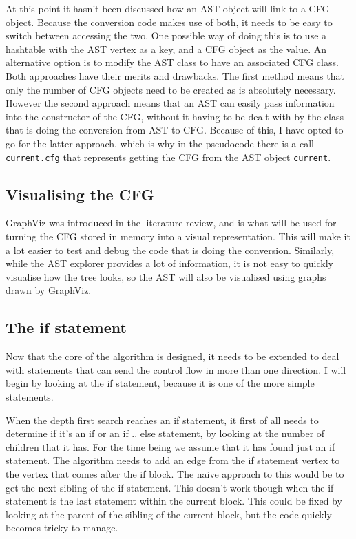 At this point it hasn't been discussed how an AST object will link to a CFG object. Because the conversion code makes use of both, it needs to be easy to switch between accessing the two. One possible way of doing this is to use a hashtable with the AST vertex as a key, and a CFG object as the value. An alternative option is to modify the AST class to have an associated CFG class. Both approaches have their merits and drawbacks. The first method means that only the number of CFG objects need to be created as is absolutely necessary. However the second approach means that an AST can easily pass information into the constructor of the CFG, without it having to be dealt with by the class that is doing the conversion from AST to CFG. Because of this, I have opted to go for the latter approach, which is why in the pseudocode there is a call \verb|current.cfg| that represents getting the CFG from the AST object \verb|current|.

\subsection{Visualising the CFG}

GraphViz was introduced in the literature review, and is what will be used for turning the CFG stored in memory into a visual representation. This will make it a lot easier to test and debug the code that is doing the conversion. Similarly, while the AST explorer provides a lot of information, it is not easy to quickly visualise how the tree looks, so the AST will also be visualised using graphs drawn by GraphViz.

\subsection{The if statement}

Now that the core of the algorithm is designed, it needs to be extended to deal with statements that can send the control flow in more than one direction. I will begin by looking at the if statement, because it is one of the more simple statements.

When the depth first search reaches an if statement, it first of all needs to determine if it's an if or an if .. else statement, by looking at the number of children that it has. For the time being we assume that it has found just an if statement. The algorithm needs to add an edge from the if statement vertex to the vertex that comes after the if block. The naive approach to this would be to get the next sibling of the if statement. This doesn't work though when the if statement is the last statement within the current block. This could be fixed by looking at the parent of the sibling of the current block, but the code quickly becomes tricky to manage.

